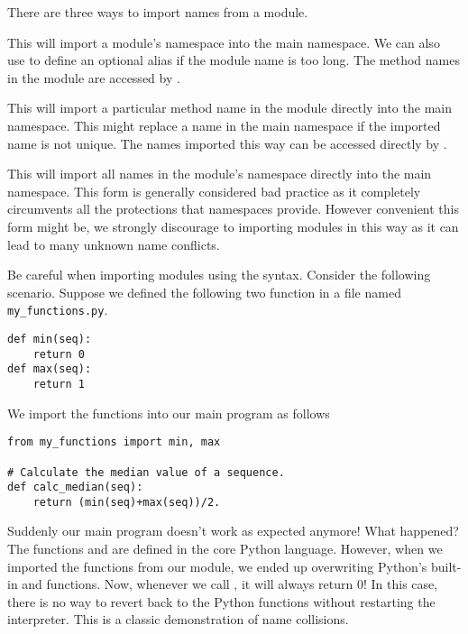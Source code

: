 There are three ways to import names from a module.
\begin{description}
\item {} This will import a module's namespace into the main namespace.
We can also use  to define an optional alias if the module name is too long.
The method names in the module are accessed by .
\item {} This will import a particular method name in the module directly into the main namespace.
This might replace a name in the main namespace if the imported name is not unique.
The names imported this way can be accessed directly by .
\item {} This will import all names in the module's namespace directly into the main namespace.
This form is generally considered bad practice as it completely circumvents all the protections that namespaces provide.
However convenient this form might be, we strongly discourage to importing modules in this way as it can lead to many unknown name conflicts.
\end{description}

\begin{warn}
Be careful when importing modules using the  syntax.
Consider the following scenario.
Suppose we defined the following two function in a file named \texttt{my\_functions.py}.
\begin{lstlisting}
def min(seq):
    return 0
def max(seq):
    return 1
\end{lstlisting}

We import the functions into our main program as follows
\begin{lstlisting}
from my_functions import min, max

# Calculate the median value of a sequence.
def calc_median(seq):
    return (min(seq)+max(seq))/2.
\end{lstlisting}

Suddenly our main program doesn't work as expected anymore!  What happened?
The functions  and  are defined in the core Python language.
However, when we imported the functions from our module, we ended up overwriting Python's built-in  and  functions.
Now, whenever we call , it will always return 0!
In this case, there is no way to revert back to the Python functions without restarting the interpreter.
This is a classic demonstration of name collisions.
\end{warn}

